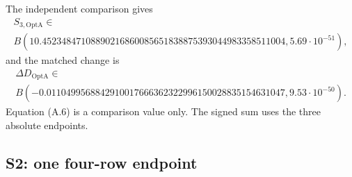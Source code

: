 {The independent comparison gives
{\normalsize
\[
\begin{gathered}
 S_{3,\mathrm{OptA}}\in\\
B(10.45234847108890216860085651838875393044983358511004,
   5.69\cdot10^{-51}),
\end{gathered}
\]
}
and the matched change is
{\normalsize
\[
\begin{gathered}
 \Delta D_{\mathrm{OptA}}\in\\
B(-0.0110499568842910017666362322996150028835154631047,
   9.53\cdot10^{-50}).
\end{gathered}\tag{A.6}
\]
}
Equation (A.6) is a comparison value only.
The signed sum uses the three absolute endpoints.

\subsection{S2: one four-row endpoint}

}
